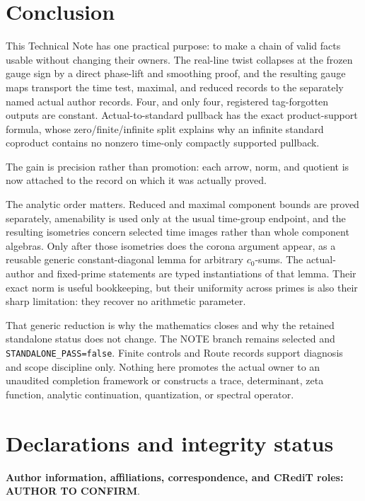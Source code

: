 \documentclass[11pt]{article}
\theoremstyle{definition}
\newcommand{\AuthorConfirm}{\textbf{AUTHOR TO CONFIRM}}
\begin{document}
\section{Conclusion}\label{sec:conclusion}

This Technical Note has one practical purpose: to make a chain of valid
facts usable without changing their owners.  The real-line twist collapses
at the frozen gauge sign by a direct phase-lift and smoothing proof, and the
resulting gauge maps transport the time test, maximal, and reduced records to
the separately named actual author records.  Four, and only four, registered
tag-forgotten outputs are constant.  Actual-to-standard pullback has the
exact product-support formula, whose zero/finite/infinite split explains why
an infinite standard coproduct contains no nonzero time-only compactly
supported pullback.

The gain is precision rather than promotion: each arrow, norm, and quotient
is now attached to the record on which it was actually proved.

The analytic order matters.  Reduced and maximal component bounds are proved
separately, amenability is used only at the usual time-group endpoint, and
the resulting isometries concern selected time images rather than whole
component algebras.  Only after those isometries does the corona argument
appear, as a reusable generic constant-diagonal lemma for arbitrary
$c_0$-sums.  The actual-author and fixed-prime statements are typed
instantiations of that lemma.  Their exact norm is useful bookkeeping, but
their uniformity across primes is also their sharp limitation: they recover
no arithmetic parameter.

That generic reduction is why the mathematics closes and why the retained
standalone status does not change.  The NOTE branch remains selected and
\texttt{STANDALONE\_PASS=false}.  Finite controls and Route records support
diagnosis and scope discipline only.  Nothing here promotes the actual owner
to an unaudited completion framework or constructs a trace, determinant,
zeta function, analytic continuation, quantization, or spectral operator.

\section*{Declarations and integrity status}

\noindent\textbf{Author information, affiliations, correspondence, and
CRediT roles:} \AuthorConfirm.
\end{document}
